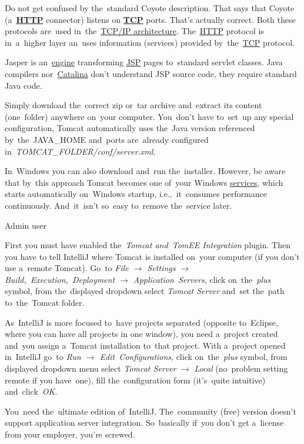 \warning Do not get confused by the~standard Coyote description.
That says that Coyote (a~\hyperref[http]{\textbf{HTTP}} connector) listens on \hyperref[tcp]{\textbf{TCP}} ports.
That's actually correct.
Both these protocols are~used in~the~\hyperref[tcpip]{TCP/IP architecture}.
The~\hyperref[http]{HTTP} protocol is in~a~higher layer an~uses information (services) provided by~the~\hyperref[tcp]{TCP} protocol.

Jasper is an~\hyperref[engine]{engine} transforming \hyperref[jsp]{JSP} pages to~standard servlet classes.
Java compilers nor~\hyperref[catalina]{Catalina} don't understand JSP source code, they require standard Java code.

Simply download the~correct zip or~tar archive and~extract its content (one~folder) anywhere on~your computer.
You~don't have to~set~up any special configuration, Tomcat automatically uses the~Java version referenced by~the~JAVA\_HOME and~ports are~already configured in~\textit{TOMCAT\_FOLDER/conf/server.xml}.

\warning In~Windows you can also download and~run the~installer.
However, be aware that by~this approach Tomcat becomes one of~your Windows \hyperref[applicationprocessprogramservicethread]{services}, which starts automatically on~Windows startup, i.e.,~it~consumes performance continuously.
And~it~isn't so~easy to~remove the~service later.

\todo Admin user




First you must have enabled the~\textit{Tomcat and~TomEE Integration} plugin.
Then you have to tell IntelliJ where Tomcat is installed on~your computer (if you don't use a~remote Tomcat).
Go~to \textit{File $\rightarrow$ Settings $\rightarrow$ Build,~Execution,~Deployment $\rightarrow$ Application~Servers}, click on~the~\textit{plus} symbol, from the~displayed dropdown select \textit{Tomcat Server} and~set the~path to~the~Tomcat folder.

As~IntelliJ is more focused to~have projects separated (opposite to~Eclipse, where you can have all projects in one window), you need a~project created and~you assign a~Tomcat installation to~that project.
With a~project opened in~IntelliJ go~to \textit{Run $\rightarrow$ Edit~Configurations}, click on~the~\textit{plus} symbol, from displayed dropdown menu select \textit{Tomcat Server} $\rightarrow$ \textit{Local} (no~problem setting remote if you have~one), fill the~configuration form (it's~quite intuitive) and~click~\textit{OK}.

\warning You~need the~ultimate edition of~IntelliJ.
The~community (free) version doesn't support application server integration.
So~basically if~you don't get a~license from your employer, you're screwed.

